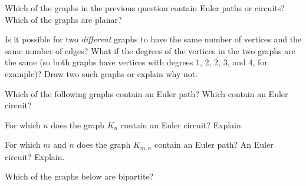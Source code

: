 \documentclass[11pt]{exam}
\newcommand{\vtx}[2]{node[fill,circle,inner sep=0pt, minimum size=7pt,label=#1:#2]{}}
\renewcommand{\v}{\vtx{above}{}}
\begin{document}
\begin{questions}
\begin{center}
\end{center}

\question Which of the graphs in the previous question contain Euler paths or circuits?  Which of the graphs are planar?

\question Is it possible for two {\em different} graphs to have the same number of vertices and the same number of edges?  What if the degrees of the vertices in the two graphs are the same (so both graphs have vertices with degrees 1, 2, 2, 3, and 4, for example)?  Draw two such graphs or explain why not.

\question Which of the following graphs contain an Euler path?  Which contain an Euler circuit?

\question For which $n$ does the graph $K_n$ contain an Euler circuit?  Explain.

\question For which $m$ and $n$ does the graph $K_{m,n}$ contain an Euler path?  An Euler circuit?  Explain.

\question Which of the graphs below are bipartite?  

\begin{center}
  \hfill
  \hfill
  \hfill 


\end{center}
\end{questions}
\end{document}
